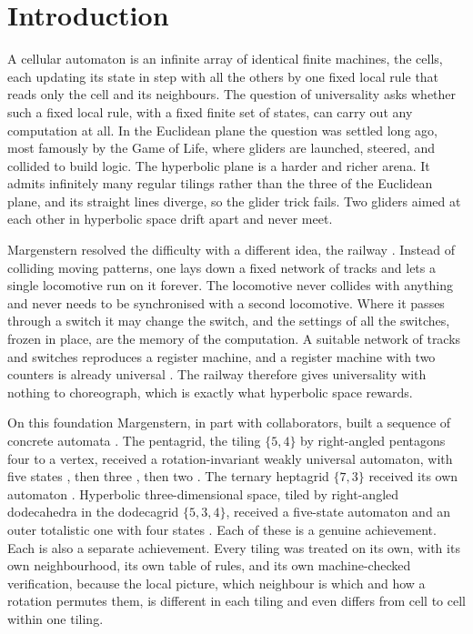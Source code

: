 \section{Introduction}

A cellular automaton is an infinite array of identical finite machines, the cells, each updating its state in
step with all the others by one fixed local rule that reads only the cell and its neighbours. The question of
universality asks whether such a fixed local rule, with a fixed finite set of states, can carry out any
computation at all. In the Euclidean plane the question was settled long ago, most famously by the Game of
Life, where gliders are launched, steered, and collided to build logic. The hyperbolic plane is a harder and
richer arena. It admits infinitely many regular tilings rather than the three of the Euclidean plane, and its
straight lines diverge, so the glider trick fails. Two gliders aimed at each other in hyperbolic space drift
apart and never meet.

Margenstern resolved the difficulty with a different idea, the railway \cite{stewart1994}. Instead of
colliding moving patterns, one lays down a fixed network of tracks and lets a single locomotive run on it
forever. The locomotive never collides with anything and never needs to be synchronised with a second
locomotive. Where it passes through a switch it may change the switch, and the settings of all the switches,
frozen in place, are the memory of the computation. A suitable network of tracks and switches reproduces a
register machine, and a register machine with two counters is already universal \cite{minsky1967}. The
railway therefore gives universality with nothing to choreograph, which is exactly what hyperbolic space
rewards.

On this foundation Margenstern, in part with collaborators, built a sequence of concrete automata
\cite{margenstern2008vol2}. The pentagrid, the tiling $\{5,4\}$ by right-angled pentagons four to a vertex,
received a rotation-invariant weakly universal automaton, with five states \cite{margenstern2014penta5},
then three \cite{margenstern2015penta3}, then two \cite{margenstern2015penta2}. The ternary heptagrid
$\{7,3\}$ received its own automaton \cite{margenstern2009hepta}. Hyperbolic three-dimensional space, tiled by
right-angled dodecahedra in the dodecagrid $\{5,3,4\}$, received a five-state automaton
\cite{margenstern2021dodeca5} and an outer totalistic one with four states \cite{margenstern2021dodeca4}. Each
of these is a genuine achievement. Each is also a separate achievement. Every tiling was treated on its own,
with its own neighbourhood, its own table of rules, and its own machine-checked verification, because the
local picture, which neighbour is which and how a rotation permutes them, is different in each tiling and even
differs from cell to cell within one tiling.

